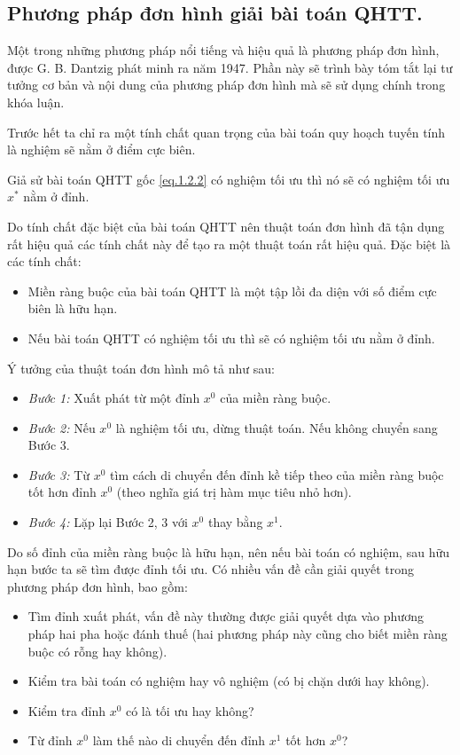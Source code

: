 \subsection{Phương pháp đơn hình giải bài toán QHTT.}
Một trong những phương pháp nổi tiếng và hiệu quả là phương pháp đơn hình, được G. B. Dantzig phát minh ra năm 1947. Phần này sẽ trình bày tóm tắt lại tư tưởng cơ bản và nội dung của phương pháp đơn hình mà sẽ sử dụng chính trong khóa luận.

Trước hết ta chỉ ra một tính chất quan trọng của bài toán quy hoạch tuyến tính là nghiệm sẽ nằm ở điểm cực biên.
\begin{lemma}\label{le.1.2.1}
Giả sử bài toán QHTT gốc \eqref{eq.1.2.2} có nghiệm tối ưu thì nó sẽ có nghiệm tối ưu $x^{*}$ nằm ở đỉnh.
\end{lemma}

Do tính chất đặc biệt của bài toán QHTT nên thuật toán đơn hình đã tận dụng rất hiệu quả các tính chất này để tạo ra một thuật toán rất hiệu quả. 
Đặc biệt là các tính chất:
\begin{itemize}
\item Miền ràng buộc của bài toán QHTT là một tập lồi đa diện với số điểm cực biên là hữu hạn.
\item Nếu bài toán QHTT có nghiệm tối ưu thì sẽ có nghiệm tối ưu nằm ở đỉnh.
\end{itemize}
Ý tưởng của thuật toán đơn hình mô tả như sau:
\begin{itemize}
\item[]{\it Bước 1: } Xuất phát từ một đỉnh $x^0$ của miền ràng buộc.
\item[]{\it Bước 2: } Nếu $x^0$ là nghiệm tối ưu, dừng thuật toán. Nếu không chuyển sang Bước 3.
\item[]{\it Bước 3: } Từ $x^0$ tìm cách di chuyển đến đỉnh kề tiếp theo của miền ràng buộc tốt hơn đỉnh $x^0$ (theo nghĩa giá trị hàm mục tiêu nhỏ hơn).
\item[]{\it Bước 4: } Lặp lại Bước 2, 3 với $x^0$ thay bằng $x^1$.
\end{itemize}
Do số đỉnh của miền ràng buộc là hữu hạn, nên nếu bài toán có nghiệm, sau hữu hạn bước ta sẽ tìm được đỉnh tối ưu.
Có nhiều vấn đề cần giải quyết trong phương pháp đơn hình, bao gồm:
\begin{itemize}
\item Tìm đỉnh xuất phát, vấn đề này thường được giải quyết dựa vào phương pháp hai pha hoặc đánh thuế (hai phương pháp này cũng cho biết miền ràng buộc có rỗng hay không).
\item Kiểm tra bài toán có nghiệm hay vô nghiệm (có bị chặn dưới hay không).
\item Kiểm tra đỉnh $x^0$ có là tối ưu hay không?
\item Từ đỉnh $x^0$ làm thế nào di chuyển đến đỉnh $x^1$ tốt hơn $x^0$?
\end{itemize}

